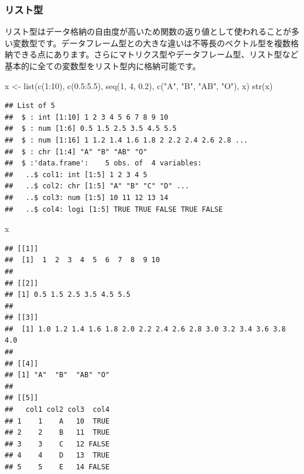 \documentclass[
  12pt,
]{book}
\newenvironment{Shaded}{\begin{snugshade}}{\end{snugshade}}
\newcommand{\DecValTok}[1]{\textcolor[rgb]{0.00,0.00,0.81}{#1}}
\newcommand{\FloatTok}[1]{\textcolor[rgb]{0.00,0.00,0.81}{#1}}
\newcommand{\FunctionTok}[1]{\textcolor[rgb]{0.00,0.00,0.00}{#1}}
\newcommand{\NormalTok}[1]{#1}
\newcommand{\OtherTok}[1]{\textcolor[rgb]{0.56,0.35,0.01}{#1}}
\newcommand{\SpecialCharTok}[1]{\textcolor[rgb]{0.00,0.00,0.00}{#1}}
\newcommand{\StringTok}[1]{\textcolor[rgb]{0.31,0.60,0.02}{#1}}
\begin{document}
\hypertarget{ux30eaux30b9ux30c8ux578b}{%
\subsubsection{リスト型}\label{ux30eaux30b9ux30c8ux578b}}

リスト型はデータ格納の自由度が高いため関数の返り値として使われることが多い変数型です。データフレーム型との大きな違いは不等長のベクトル型を複数格納できる点にあります。さらにマトリクス型やデータフレーム型、リスト型など基本的に全ての変数型をリスト型内に格納可能です。

\begin{Shaded}
\begin{Highlighting}[numbers=left,,]
\NormalTok{x }\OtherTok{\textless{}{-}} \FunctionTok{list}\NormalTok{(}\FunctionTok{c}\NormalTok{(}\DecValTok{1}\SpecialCharTok{:}\DecValTok{10}\NormalTok{), }\FunctionTok{c}\NormalTok{(}\FloatTok{0.5}\SpecialCharTok{:}\FloatTok{5.5}\NormalTok{), }\FunctionTok{seq}\NormalTok{(}\DecValTok{1}\NormalTok{, }\DecValTok{4}\NormalTok{, }\FloatTok{0.2}\NormalTok{), }\FunctionTok{c}\NormalTok{(}\StringTok{"A"}\NormalTok{, }\StringTok{"B"}\NormalTok{, }\StringTok{"AB"}\NormalTok{, }\StringTok{"O"}\NormalTok{), x)}
\FunctionTok{str}\NormalTok{(x)}
\end{Highlighting}
\end{Shaded}

\begin{verbatim}
## List of 5
##  $ : int [1:10] 1 2 3 4 5 6 7 8 9 10
##  $ : num [1:6] 0.5 1.5 2.5 3.5 4.5 5.5
##  $ : num [1:16] 1 1.2 1.4 1.6 1.8 2 2.2 2.4 2.6 2.8 ...
##  $ : chr [1:4] "A" "B" "AB" "O"
##  $ :'data.frame':    5 obs. of  4 variables:
##   ..$ col1: int [1:5] 1 2 3 4 5
##   ..$ col2: chr [1:5] "A" "B" "C" "D" ...
##   ..$ col3: num [1:5] 10 11 12 13 14
##   ..$ col4: logi [1:5] TRUE TRUE FALSE TRUE FALSE
\end{verbatim}

\begin{Shaded}
\begin{Highlighting}[numbers=left,,]
\NormalTok{x}
\end{Highlighting}
\end{Shaded}

\begin{verbatim}
## [[1]]
##  [1]  1  2  3  4  5  6  7  8  9 10
## 
## [[2]]
## [1] 0.5 1.5 2.5 3.5 4.5 5.5
## 
## [[3]]
##  [1] 1.0 1.2 1.4 1.6 1.8 2.0 2.2 2.4 2.6 2.8 3.0 3.2 3.4 3.6 3.8 4.0
## 
## [[4]]
## [1] "A"  "B"  "AB" "O" 
## 
## [[5]]
##   col1 col2 col3  col4
## 1    1    A   10  TRUE
## 2    2    B   11  TRUE
## 3    3    C   12 FALSE
## 4    4    D   13  TRUE
## 5    5    E   14 FALSE
\end{verbatim}
\end{document}

